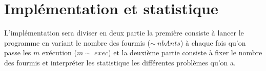 \section{Implémentation et statistique}
L'implémentation sera diviser en deux partie la première consiste à lancer le programme en variant le nombre des fourmis ($\mathtt{\sim}\ nbAnts $) à chaque fois qu'on passe les $ m $ exécution ($ m \mathtt{\sim}\ exec $) et la deuxième partie consiste à fixer le nombre des fourmis et interpréter les statistique les différentes  problèmes qu'on a.



\pagebreak

